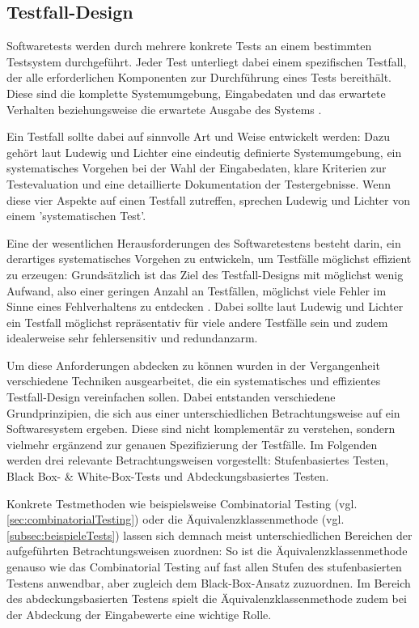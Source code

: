 \subsection{Testfall-Design}\label{subsec:testfallDesign}

Softwaretests werden durch mehrere konkrete Tests an einem bestimmten Testsystem durchgeführt. Jeder Test unterliegt dabei einem spezifischen Testfall, der alle erforderlichen Komponenten zur Durchführung eines Tests bereithält. Diese sind die komplette Systemumgebung, Eingabedaten und das erwartete Verhalten beziehungsweise die erwartete Ausgabe des Systems \cite[S. 86]{schneider2012abenteuer}. 

Ein Testfall sollte dabei auf sinnvolle Art und Weise entwickelt werden: Dazu gehört laut Ludewig und Lichter \cite[S. 480]{ludewig2010software} eine eindeutig definierte Systemumgebung, ein systematisches Vorgehen bei der Wahl der Eingabedaten, klare Kriterien zur Testevaluation und eine detaillierte Dokumentation der Testergebnisse. Wenn diese vier Aspekte auf einen Testfall zutreffen, sprechen Ludewig und Lichter von einem 'systematischen Test'.

Eine der wesentlichen Herausforderungen des Softwaretestens besteht darin, ein derartiges systematisches Vorgehen zu entwickeln, um Testfälle möglichst effizient zu erzeugen: Grundsätzlich ist das Ziel des Testfall-Designs mit möglichst wenig Aufwand, also einer geringen Anzahl an Testfällen, möglichst viele Fehler im Sinne eines Fehlverhaltens zu entdecken \cite[S. 498]{ludewig2010software}. Dabei sollte laut Ludewig und Lichter \cite[S. 498]{ludewig2010software} ein Testfall möglichst repräsentativ für viele andere Testfälle sein und zudem idealerweise sehr fehlersensitiv und redundanzarm.

Um diese Anforderungen abdecken zu können wurden in der Vergangenheit verschiedene Techniken ausgearbeitet, die ein systematisches und effizientes Testfall-Design vereinfachen sollen. Dabei entstanden verschiedene Grundprinzipien, die sich aus einer unterschiedlichen Betrachtungsweise auf ein Softwaresystem ergeben. Diese sind nicht komplementär zu verstehen, sondern vielmehr ergänzend zur genauen Spezifizierung der Testfälle. Im Folgenden werden drei relevante Betrachtungsweisen vorgestellt: Stufenbasiertes Testen, Black Box- \& White-Box-Tests und Abdeckungsbasiertes Testen.

Konkrete Testmethoden wie beispielsweise Combinatorial Testing (vgl. \autoref{sec:combinatorialTesting}) oder die Äquivalenzklassenmethode (vgl. \autoref{subsec:beispieleTests}) lassen sich demnach meist unterschiedlichen Bereichen der aufgeführten Betrachtungsweisen zuordnen: So ist die Äquivalenzklassenmethode genauso wie das Combinatorial Testing auf fast allen Stufen des stufenbasierten Testens anwendbar, aber zugleich dem Black-Box-Ansatz zuzuordnen. Im Bereich des abdeckungsbasierten Testens spielt die Äquivalenzklassenmethode zudem bei der Abdeckung der Eingabewerte eine wichtige Rolle.

